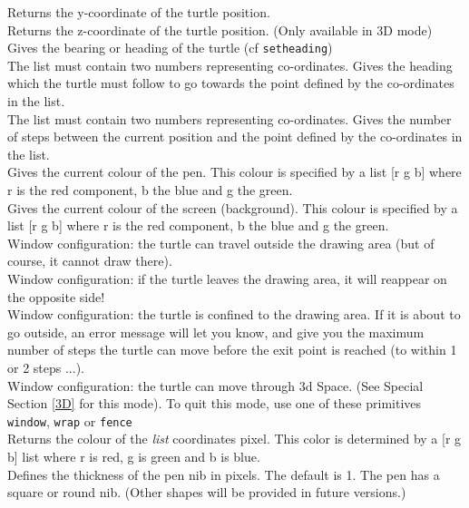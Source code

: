  Returns the y-coordinate of the turtle position.\\
 Returns the z-coordinate of the turtle position. (Only available in 3D mode)\\
 Gives the bearing or heading of the turtle (cf \texttt{setheading})  \\
The list must contain two numbers representing co-ordinates.  Gives the heading which the turtle must follow to go towards the point defined by the co-ordinates in the list.\\
The list must contain two numbers representing co-ordinates.  Gives the number of steps between the current position and the point defined by the co-ordinates in the list.\\
 Gives the current colour of the pen.  This colour is specified by a list [r g b] where r is the red component, b the blue and g the green.  \\
 Gives the current colour of the screen (background).  This colour is specified by a list [r g b] where r is the red component, b the blue and g the green.  \\
Window configuration: the turtle can travel outside the drawing area (but of course, it cannot draw there).\\
Window configuration: if the turtle leaves the drawing area, it will reappear on the opposite side!\\
Window configuration: the turtle is confined to the drawing area.  If it is about to go outside, an error message will let you know, and give you the maximum number of steps the turtle can move before the exit point is reached (to within 1 or 2 steps ...).\\
Window configuration: the turtle can move through 3d Space. (See Special Section \ref{3D} for this mode). To quit this mode, use one of these primitives \texttt{window}, \texttt{wrap} or \texttt{fence}\\
Returns the colour of the \textit{list} coordinates pixel. This color is determined by a [r g b] list where r is red, g is green and b is blue. \\
Defines the thickness of the pen nib in pixels.  The default is 1. The pen has a square or round nib.  (Other shapes will be provided in future versions.)\\
